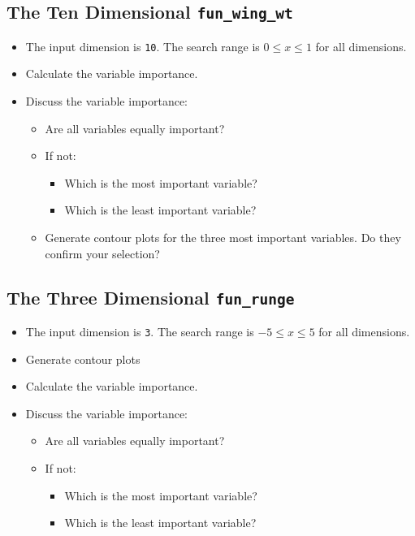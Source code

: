 \documentclass[
  letterpaper,
  DIV=11,
  numbers=noendperiod]{scrreprt}
\providecommand{\tightlist}{%
  \setlength{\itemsep}{0pt}\setlength{\parskip}{0pt}}\usepackage{longtable,booktabs,array}
\begin{document}
\hypertarget{the-ten-dimensional-fun_wing_wt}{%
\subsection{\texorpdfstring{The Ten Dimensional
\texttt{fun\_wing\_wt}}{The Ten Dimensional fun\_wing\_wt}}\label{the-ten-dimensional-fun_wing_wt}}

\begin{itemize}
\tightlist
\item
  The input dimension is \texttt{10}. The search range is
  \(0 \leq x \leq 1\) for all dimensions.
\item
  Calculate the variable importance.
\item
  Discuss the variable importance:

  \begin{itemize}
  \tightlist
  \item
    Are all variables equally important?
  \item
    If not:

    \begin{itemize}
    \tightlist
    \item
      Which is the most important variable?
    \item
      Which is the least important variable?
    \end{itemize}
  \item
    Generate contour plots for the three most important variables. Do
    they confirm your selection?
  \end{itemize}
\end{itemize}

\hypertarget{the-three-dimensional-fun_runge}{%
\subsection{\texorpdfstring{The Three Dimensional
\texttt{fun\_runge}}{The Three Dimensional fun\_runge}}\label{the-three-dimensional-fun_runge}}

\begin{itemize}
\tightlist
\item
  The input dimension is \texttt{3}. The search range is
  \(-5 \leq x \leq 5\) for all dimensions.
\item
  Generate contour plots
\item
  Calculate the variable importance.
\item
  Discuss the variable importance:

  \begin{itemize}
  \tightlist
  \item
    Are all variables equally important?
  \item
    If not:

    \begin{itemize}
    \tightlist
    \item
      Which is the most important variable?
    \item
      Which is the least important variable?
    \end{itemize}
  \end{itemize}
\end{itemize}
\end{document}
